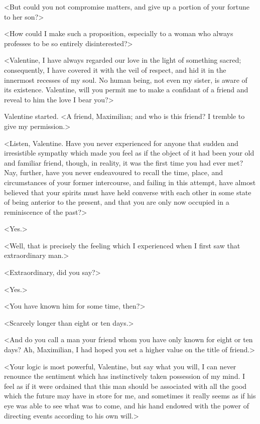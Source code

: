  <But could you not compromise matters, and give up a portion of your fortune to her son?> 

 <How could I make such a proposition, especially to a woman who always professes to be so entirely disinterested?> 

 <Valentine, I have always regarded our love in the light of something sacred; consequently, I have covered it with the veil of respect, and hid it in the innermost recesses of my soul. No human being, not even my sister, is aware of its existence. Valentine, will you permit me to make a confidant of a friend and reveal to him the love I bear you?> 

 Valentine started. <A friend, Maximilian; and who is this friend? I tremble to give my permission.> 

 <Listen, Valentine. Have you never experienced for anyone that sudden and irresistible sympathy which made you feel as if the object of it had been your old and familiar friend, though, in reality, it was the first time you had ever met? Nay, further, have you never endeavoured to recall the time, place, and circumstances of your former intercourse, and failing in this attempt, have almost believed that your spirits must have held converse with each other in some state of being anterior to the present, and that you are only now occupied in a reminiscence of the past?> 

 <Yes.> 

 <Well, that is precisely the feeling which I experienced when I first saw that extraordinary man.> 

 <Extraordinary, did you say?> 

 <Yes.> 

 <You have known him for some time, then?> 

 <Scarcely longer than eight or ten days.> 

 <And do you call a man your friend whom you have only known for eight or ten days? Ah, Maximilian, I had hoped you set a higher value on the title of friend.> 

 <Your logic is most powerful, Valentine, but say what you will, I can never renounce the sentiment which has instinctively taken possession of my mind. I feel as if it were ordained that this man should be associated with all the good which the future may have in store for me, and sometimes it really seems as if his eye was able to see what was to come, and his hand endowed with the power of directing events according to his own will.> 

